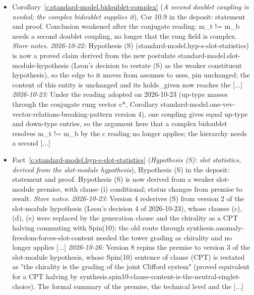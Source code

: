 \documentclass[11pt]{article}
\theoremstyle{definition}
\theoremstyle{plain}
\begin{document}
\begin{itemize}
\item Corollary~\ref{c:standard-model.bidoublet-complex} (\emph{A second doublet coupling is needed; the complex bidoublet supplies it}), Cor 10.9 in the deposit: statement and proof. Conclusion weakened after the conjugate reading: m\_t != m\_b needs a second doublet coupling, no longer that the rung field is complex. \emph{Store notes.} \emph{2026-10-22:} Hypothesis (S) (standard-model.hyp-s-slot-statistics) is now a proved claim derived from the new postulate standard-model.slot-module-hypothesis (Leon's decision to restate (S) as the weaker constituent hypothesis), so the edge to it moves from assumes to uses, pin unchanged; the content of this entity is unchanged and its holds\_given now reaches the [...] \emph{2026-10-23:} Under the reading adopted on 2026-10-23 (up-type masses through the conjugate rung vector c*, Corollary standard-model.one-vev-vector-relations-breaking-pattern version 4), one coupling gives equal up-type and down-type entries, so the argument here that a complex bidoublet resolves m\_t != m\_b by the c reading no longer applies; the hierarchy needs a second [...]
\item Fact~\ref{c:standard-model.hyp-s-slot-statistics} (\emph{Hypothesis (S): slot statistics, derived from the slot-module hypothesis}), Hypothesis (S) in the deposit: statement and proof. Hypothesis (S) is now derived from a weaker slot-module premise, with clause (i) conditional; status changes from premise to result. \emph{Store notes.} \emph{2026-10-23:} Version 4 rederives (S) from version 2 of the slot-module hypothesis (Leon's decision 4 of 2026-10-23), whose clauses (c), (d), (e) were replaced by the generation clause and the chirality as a CPT halving commuting with Spin(10): the old route through synthesis.anomaly-freedom-forces-slot-content needed the tower grading as chirality and no longer applies [...] \emph{2026-10-26:} Version 8 repins the premise to version 3 of the slot-module hypothesis, whose Spin(10) sentence of clause (CPT) is restated as "the chirality is the grading of the joint Clifford system" (proved equivalent for a CPT halving by synthesis.spin10-clause-content-is-the-neutral-singlet-choice). The formal summary of the premise, the technical level and the [...]
\end{itemize}
\end{document}
